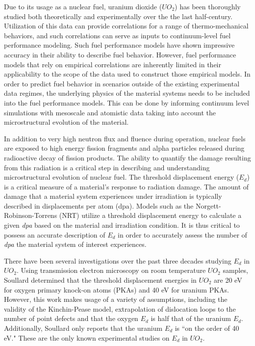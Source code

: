 \documentclass[8pt]{article}   	%
\begin{document}
\hspace{5mm}
Due to its usage as a nuclear fuel, uranium dioxide ($UO_2$) has been thoroughly studied both theoretically and experimentally over the the last half-century. Utilization of this data can provide correlations for a range of thermo-mechanical behaviors, and such correlations can serve as inputs to continuum-level fuel performance modeling. Such fuel performance models \cite{williamson_et_al_2012, falcon04, bentejac2004, thouvenin2007, sercombe2009} have shown impressive accuracy in their ability to describe fuel behavior. However, fuel performance models that rely on empirical correlations are inherently limited in their applicability to the scope of the data used to construct those empirical models. In order to predict fuel behavior in scenarios outside of the existing experimental data regimes, the underlying physics of the material systems needs to be included into the fuel performance models. This can be done by informing continuum level simulations with mesoscale and atomistic data taking into account the microstructural evolution of the material.

In addition to very high neutron flux and fluence during operation, nuclear fuels are exposed to high energy fission fragments and alpha particles released during radioactive decay of fission products. The ability to quantify the damage resulting from this radiation is a critical step in describing and understanding microstructural evolution of nuclear fuel. The threshold displacement energy ($E_d$) is a critical measure of a material's response to radiation damage. The amount of damage that a material system experiences under irradiation is typically described in displacements per atom (dpa).  Models such as the Norgett-Robinson-Torrens (NRT) \cite{nrt} utilize a threshold displacement energy to calculate a given \textit{dpa} based on the material and irradiation condition.  It is thus critical to possess an accurate description of $E_d$ in order to accurately assess the number of \textit{dpa} the material system of interest experiences.

There have been several investigations over the past three decades studying $E_d$ in $UO_2$. Using transmission electron microscopy on room temperature $UO_2$ samples, Soullard \cite{soullard1977,soullard1985} determined that the threshold displacement energies in $UO_2$ are 20 eV for oxygen primary knock-on atoms (PKAs) and 40 eV for uranium PKAs. However, this work makes usage of a variety of assumptions, including the validity of the Kinchin-Pease model, extrapolation of dislocation loops to the number of point defects and that the oxygen $E_d$ is half that of the uranium $E_d$. Additionally, Soullard only reports that the uranium $E_d$ is ``on the order of 40 eV." These are the only known experimental studies on $E_d$ in $UO_2$.
\end{document}
